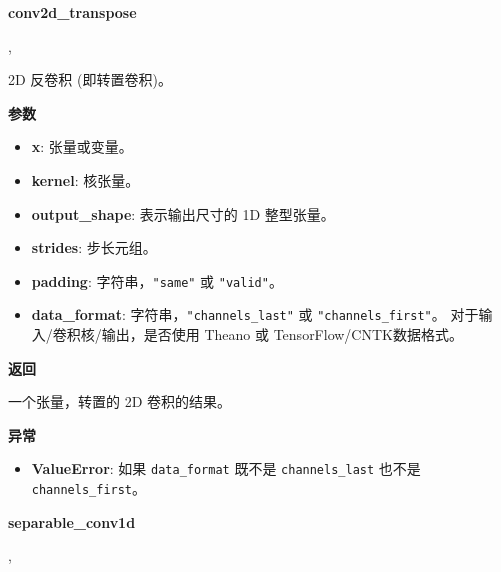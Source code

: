 \textbf{conv2d\_transpose}\label{conv2dux5ftranspose}

\begin{Shaded}
\begin{Highlighting}[]
\OperatorTok{=}\NormalTok{(}\NormalTok{, }\OperatorTok{=}, \\
\hspace{3cm}\OperatorTok{=}\NormalTok{)}
\end{Highlighting}
\end{Shaded}

2D 反卷积 (即转置卷积)。

\textbf{参数}

\begin{itemize}
\tightlist
\item
  \textbf{x}: 张量或变量。
\item
  \textbf{kernel}: 核张量。
\item
  \textbf{output\_shape}: 表示输出尺寸的 1D 整型张量。
\item
  \textbf{strides}: 步长元组。
\item
  \textbf{padding}: 字符串，\texttt{"same"} 或 \texttt{"valid"}。
\item
  \textbf{data\_format}: 字符串，\texttt{"channels\_last"} 或
  \texttt{"channels\_first"}。 对于输入/卷积核/输出，是否使用 Theano 或
  TensorFlow/CNTK数据格式。
\end{itemize}

\textbf{返回}

一个张量，转置的 2D 卷积的结果。

\textbf{异常}

\begin{itemize}
\tightlist
\item
  \textbf{ValueError}: 如果 \texttt{data\_format} 既不是
  \texttt{channels\_last} 也不是 \texttt{channels\_first}。
\end{itemize}


\textbf{separable\_conv1d}\label{separableux5fconv1d}

\begin{Shaded}
\begin{Highlighting}[]
\OperatorTok{=}, \\
\hspace{3cm}\OperatorTok{=}\OperatorTok{=}\OperatorTok{=}\NormalTok{)}
\end{Highlighting}
\end{Shaded}

